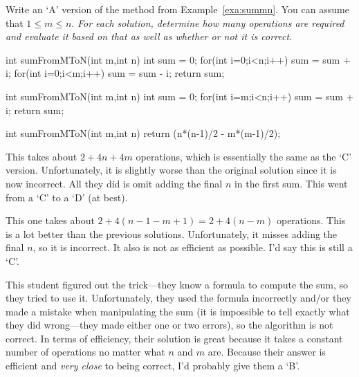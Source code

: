\begin{eval}
Write an `A' version of the method from Example~\ref{exa:summn}.
You can assume that $1\leq m\leq n$. 
{\em For each solution, determine how many operations are required and
evaluate it based on that as well as whether
or not it is correct.}
\begin{ssolenum}
\item 
\begin{code}

	int sumFromMToN(int m,int n) {
	    int sum = 0;
	    for(int i=0;i<n;i++) {
	        sum = sum + i;
	    }
	    for(int i=0;i<m;i++) {
	        sum = sum - i;
	    }
	    return sum;
	}
\end{code}
\evallinethree

\item
\begin{code}

	int sumFromMToN(int m,int n) {
	    int sum = 0;
	    for(int i=m;i<n;i++) {
	        sum = sum + i;
	    }
	    return sum;
	}
\end{code}
\evallinethree

\item
\begin{code}

	int sumFromMToN(int m,int n) {
	    return (n*(n-1)/2 - m*(m-1)/2);
	}
\end{code}
\evallinethree

\end{ssolenum}
\begin{answer}
\begin{solevalenum}
\item
This takes about $2+4n+4m$ operations, which is essentially the
same as the `C' version.  Unfortunately, it is slightly worse than the original
solution since it is now incorrect.  All they did is omit adding the final $n$ in the first
sum.  This went from a `C' to a `D' (at best).
\item
This one takes about $2+4(n-1-m+1)=2+4(n-m)$ operations.  This is a lot better than
the previous solutions.  Unfortunately, it misses adding the final $n$, so it is incorrect.
It also is not as efficient as possible.  I'd say this is still a `C'.
\item
This student figured out the trick---they know a formula to compute the sum, 
so they tried to use it.  
Unfortunately, they used the formula incorrectly and/or they made a mistake when
manipulating the sum (it is impossible to tell exactly what they did wrong---they 
made either one or two errors), so the algorithm is not correct.
In terms of efficiency, their solution is great because it takes a constant
number of operations no matter what $n$ and $m$ are.    
Because their answer is efficient and {\em very close} to being correct, 
I'd probably give them a `B'.
\end{solevalenum}
\end{answer}
\end{eval}

